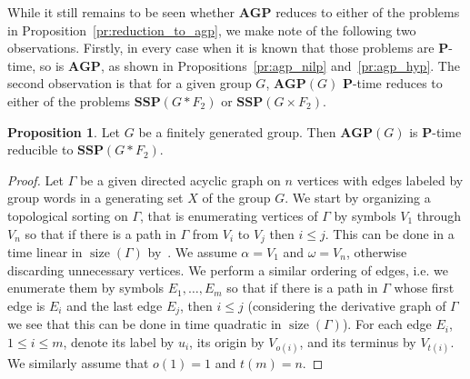\documentclass[10pt]{amsart}
\theoremstyle{definition}
\newtheorem{proposition}[theorem]{Proposition}
\DeclareMathOperator{\size}{{size}}
\def\P{{\mathbf{P}}}
\def\SSP{{\mathbf{SSP}}}
\def\AGP{{\mathbf{AGP}}}
\begin{document}
While it still remains to be seen whether $\AGP$ reduces to either of the problems in Proposition~\ref{pr:reduction_to_agp}, we make note of the following two observations. Firstly, in every case when it is known that those problems are $\P$-time, so is $\AGP$, as shown in Propositions~\ref{pr:agp_nilp} and~\ref{pr:agp_hyp}.
The second observation is that for a given group $G$, $\AGP(G)$ $\P$-time reduces to either of the problems $\SSP(G\ast F_2)$ or $\SSP(G\times F_2)$.

\begin{proposition}\label{pr:agp_to_ssp_star}
Let $G$ be a finitely generated group. Then $\AGP(G)$ is $\P$-time reducible to $\SSP(G\ast F_2)$.
\end{proposition}
\begin{proof}
Let $\Gamma$ be a given directed acyclic graph on $n$ vertices with edges labeled by group words in a generating set $X$ of the group $G$. We start by organizing a topological sorting on $\Gamma$, that is enumerating vertices of $\Gamma$ by symbols $V_1$ through $V_n$ so that if there is a path in $\Gamma$ from $V_i$ to $V_j$ then $i\le j$. This can be done in a time linear in $\size(\Gamma)$ by~\cite{Kahn}. We assume $\alpha=V_1$ and $\omega=V_n$, otherwise discarding unnecessary vertices. We perform a similar ordering of edges, i.e. we enumerate them by symbols $E_1,\ldots, E_m$ so that if there is a path in $\Gamma$ whose first edge is $E_i$ and the last edge $E_j$, then $i\le j$ (considering the derivative graph of $\Gamma$ we see that this can be done in time quadratic in $\size(\Gamma)$). For each edge $E_i$, $1\le i\le m$, denote its label by $u_i$, its origin by $V_{o(i)}$, and its terminus by $V_{t(i)}$. We similarly assume that $o(1)=1$ and $t(m)=n$.


\end{proof}
\end{document}
